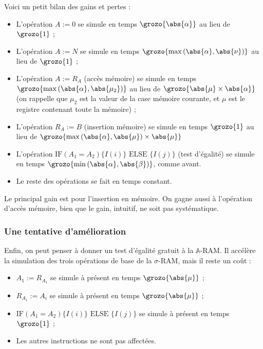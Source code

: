 \documentclass{report}
\newcommand{\sRAMifc}[2]{\text{IF} (A_1=A_2) \{I( #1 )\} \text{ ELSE } \{I( #2 )\}}
\newcommand{\bbA}{\mathbb{A}}
\begin{document}
				Voici un petit bilan des gains et pertes :
				\begin{itemize}[itemsep=-1mm]
					\item 	L'opération $A:=0$ se simule en temps $\grozo{\abs{\alpha}}$ au lieu de $\grozo{1}$ ;
					\item 	L'opération $A:=N$ se simule en temps $\grozo{\max\left( \abs{\alpha}, \abs{\nu} \right)}$ au lieu de $\grozo{1}$ ;
					\item 	L'opération $A:=R_A$ (accès mémoire) se simule en temps $\grozo{\max\left( \abs{\alpha}, \abs{\mu_2} \right)}$ au lieu de $\grozo{\abs{\mu} \times \abs{\alpha}}$ (on rappelle que $\mu_2$ est la valeur de la case mémoire courante, et $\mu$ est le registre contenant toute la mémoire) ;
					\item 	L'opération $R_A:=B$ (insertion mémoire) se simule en temps  $\grozo{1}$ au lieu de $\grozo{\max\left( \abs{\alpha}, \abs{\mu} \right)\times \abs{\mu}}$
					\item 	L'opération $\sRAMifc{i}{j}$ (test d'égalité) se simule en temps $\grozo{\min\left( \abs{\alpha} , \abs{\beta} \right)}$, comme avant.
					\item 	Le reste des opérations se fait en temps constant.
				\end{itemize}
				
				Le principal gain est pour l'insertion en mémoire. On gagne aussi à l'opération d'accès mémoire, bien que le gain, intuitif, ne soit pas systématique. 
	
	
			\subsubsection{Une tentative d'amélioration}
			\label{subsubsec:sim_amelioration}
				
				Enfin, on peut penser à donner un test d'égalité gratuit à la $\bbA$-RAM. Il accélère la simulation des trois opérations de base de la $\sigma$-RAM, mais il reste un coût : 
				
				\begin{itemize}[itemsep=-1mm]
					\item 	$A_1 := R_{A_1}$ se simule à présent en temps $\grozo{\abs{\mu}}$ ;
					\item 	$R_{A_1} := A_i$ se simule à présent en temps $\grozo{\abs{\mu}}$ ;
					\item 	$\sRAMifc{i}{j}$ se simule à présent en temps $\grozo{1}$ ;
					\item 	Les autres instructions ne sont pas affectées.
				\end{itemize}
				
\end{document}
